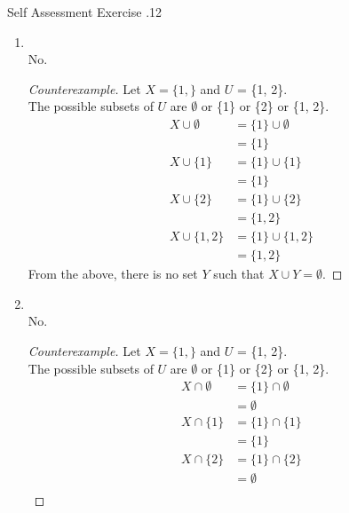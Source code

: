 \documentclass[../notes.tex]{subfiles}
\begin{document}
\begin{exercise}{Self Assessment Exercise \thechapter.12}
\begin{enumerate}
\begin{proof}
\begin{enumerate}[label=(\roman*)]
\begin{subproof}[Subproof]
									\end{subproof}
							\end{enumerate}
							As the first claim is false, it is not the case that $V \cap W = \emptyset$ iff $V = \emptyset$ or $W = \emptyset$.
						\end{proof}
					\pagebreak
					\item {}\\
						No.
						\begin{proof}[Counterexample]
							Let $X = \{1,\}$ and $U$ = \{1, 2\}.\\
							The possible subsets of $U$ are $\emptyset$ or \{1\} or \{2\} or \{1, 2\}.
							\begin{align*}
								X \cup \emptyset &= \{1\} \cup \emptyset\\
								&= \{1\}\\
								X \cup \{1\} &= \{1\} \cup \{1\}\\
								&= \{1\}\\
								X \cup \{2\} &= \{1\} \cup \{2\}\\
								&= \{1, 2\}\\
								X \cup \{1, 2\} &= \{1\} \cup \{1, 2\}\\
								&= \{1, 2\}
							\end{align*}
							From the above, there is no set $Y$ such that $X \cup Y = \emptyset$.
						\end{proof}
					\item {}\\
						No.
						\begin{proof}[Counterexample]
							Let $X = \{1,\}$ and $U$ = \{1, 2\}.\\
							The possible subsets of $U$ are $\emptyset$ or \{1\} or \{2\} or \{1, 2\}.
							\begin{align*}
								X \cap \emptyset &= \{1\} \cap \emptyset\\
								&= \emptyset\\
								X \cap \{1\} &= \{1\} \cap \{1\}\\
								&= \{1\}\\
								X \cap \{2\} &= \{1\} \cap \{2\}\\
								&= \emptyset\\

\end{align*}
\end{proof}
\end{enumerate}
\end{exercise}
\end{document}
